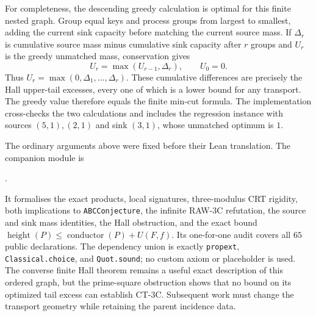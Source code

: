 For completeness, the descending greedy calculation is optimal for this
finite nested graph.  Group equal keys and process groups from largest to
smallest, adding the current sink capacity before matching the current source
mass.  If $\Delta_r$ is cumulative source mass minus cumulative sink capacity
after $r$ groups and $U_r$ is the greedy unmatched mass, conservation gives
\[
 U_r=\max(U_{r-1},\Delta_r),\qquad U_0=0.
\]
Thus $U_r=\max(0,\Delta_1,\ldots,\Delta_r)$.  These cumulative differences
are precisely the Hall upper-tail excesses, every one of which is a lower
bound for any transport.  The greedy value therefore equals the finite
min-cut formula.  The implementation cross-checks the two calculations and
includes the regression instance with
sources $(5,1),(2,1)$ and sink $(3,1)$, whose unmatched optimum is $1$.

The ordinary arguments above were fixed before their Lean translation.  The
companion module is
\begin{center}
.
\end{center}
It formalises the exact products, local signatures, three-modulus CRT rigidity,
both implications to \texttt{ABCConjecture}, the infinite RAW-3C
refutation, the source and sink mass identities, the Hall obstruction, and
the exact bound $\operatorname{height}(P)\le
\operatorname{conductor}(P)+U(F,f)$.  Its one-for-one audit covers all $65$
public declarations.  The dependency union is exactly \texttt{propext},
\texttt{Classical.choice}, and \texttt{Quot.sound}; no custom axiom or
placeholder is used.  The converse finite Hall theorem remains a useful exact
description of this ordered graph, but the prime-square obstruction shows
that no bound on its optimized tail excess can establish CT-3C.  Subsequent
work must change the transport geometry while retaining the parent incidence
data.
